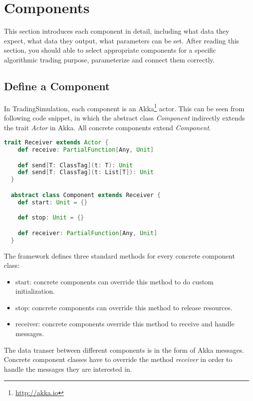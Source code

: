 \section{Components}
\label{sec:2}

This section introduces each component in detail, including  what data they expect, what data they output, what parameters can be set. After reading this section, you should able to select appropriate components for a specific algorithmic trading purpose, parameterize and connect them correctly.

\subsection{Define a Component}

In TradingSimulation, each component is an Akka\footnote{\url{http://akka.io}} actor. This can be seen from following code snippet, in which the abstract class \emph{Component} indirectly extends the trait \emph{Actor} in Akka. All concrete components extend \emph{Component}.

\begin{lstlisting}[language=Scala]
  trait Receiver extends Actor {
    def receive: PartialFunction[Any, Unit]

    def send[T: ClassTag](t: T): Unit
    def send[T: ClassTag](t: List[T]): Unit
  }

  abstract class Component extends Receiver {
    def start: Unit = {}

    def stop: Unit = {}

    def receiver: PartialFunction[Any, Unit]
  }
\end{lstlisting}

The framework defines three standard methods for every concrete component class:

\begin{itemize}
\item{start}: concrete components can override this method to do custom initialization.
\item{stop}: concrete components can override this method to release resources.
\item{receiver}: concrete components override this method to receive and handle messages.
\end{itemize}

The data transer between different components is in the form of Akka messages. Concrete component classes have to override the method \emph{receiver} in order to handle the messages they are interested in.

